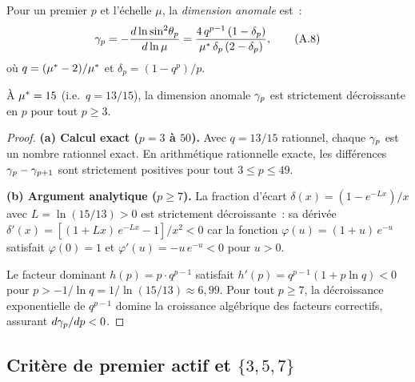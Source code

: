 \documentclass[12pt,a4paper]{article}
\begin{document}
\begin{derivedbox}
Pour un premier $p$ et l'\'echelle $\mu$, la \emph{dimension anomale}
est~:
\begin{equation}
  \gamma_{p} = -\frac{d \ln \sin^2\!\theta_p}{d \ln \mu}
  = \frac{4\,q^{p-1}\,(1 - \delta_p)}{{\mu^{*}}\,\delta_p\,(2 - \delta_p)},
  \tag{A.8}
\end{equation}
o\`u $q = ({\mu^{*}} - 2)/{\mu^{*}}$ et
$\delta_p = (1 - q^p)/p$.
\end{derivedbox}

\begin{theorembox}
\`A ${\mu^{*}} = 15$ (i.e.\ $q = 13/15$), la dimension anomale
$\gamma_{p}$ est strictement d\'ecroissante en $p$ pour tout
$p \geq 3$.

\begin{proof}
\textbf{(a) Calcul exact ($p = 3$ \`a $50$).}
Avec $q = 13/15$ rationnel, chaque $\gamma_{p}$ est un nombre rationnel
exact. En arithm\'etique rationnelle exacte, les diff\'erences
$\gamma_{p} - \gamma_{p+1}$ sont strictement positives pour tout
$3 \leq p \leq 49$.

\textbf{(b) Argument analytique ($p \geq 7$).}
La fraction d'\'ecart $\delta(x) = (1 - e^{-Lx})/x$ avec
$L = \ln(15/13) > 0$ est strictement d\'ecroissante~: sa d\'eriv\'ee
$\delta'(x) = [(1 + Lx)\,e^{-Lx} - 1]/x^2 < 0$ car la fonction
$\varphi(u) = (1+u)\,e^{-u}$ satisfait $\varphi(0) = 1$ et
$\varphi'(u) = -u\,e^{-u} < 0$ pour $u > 0$.

Le facteur dominant $h(p) = p \cdot q^{p-1}$ satisfait
$h'(p) = q^{p-1}(1 + p\ln q) < 0$ pour
$p > -1/\ln q = 1/\ln(15/13) \approx 6{,}99$. Pour tout $p \geq 7$,
la d\'ecroissance exponentielle de $q^{p-1}$ domine la croissance
alg\'ebrique des facteurs correctifs, assurant $d\gamma_{p}/dp < 0$.
\end{proof}
\end{theorembox}

\subsection{Crit\`ere de premier actif et $\{3,5,7\}$}
\label{app:active}
\end{document}
